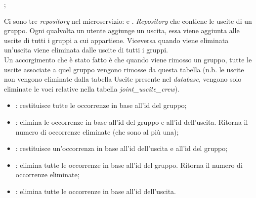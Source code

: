 \begin{center}
    ;
\end{center}
Ci sono tre \textit{repository} nel \gls{microservizio}:  e . 
\label{JointUsciteCrewRepository}
\textit{Repository} che contiene le uscite di un gruppo. Ogni qualvolta un utente aggiunge un uscita, essa viene aggiunta alle uscite di tutti i gruppi a cui appartiene. Viceversa quando viene eliminata un'uscita viene eliminata dalle uscite di tutti i gruppi.\\
Un accorgimento che è stato fatto è che quando viene rimosso un gruppo, tutte le uscite associate a quel gruppo vengono rimosse da questa tabella (n.b. le uscite non vengono eliminate dalla tabella Uscite presente nel \textit{database}, vengono solo eliminate le voci relative nella tabella \textit{joint\_uscite\_crew}).
\begin{itemize}
    \item {}: restituisce tutte le occorrenze in base all'id del gruppo;
    \item {}: elimina le occorrenze in base all'id del gruppo e all'id dell'uscita. Ritorna il numero di occorrenze eliminate (che sono al più una);
    \item {}: restituisce un'occorrenza in base all'id dell'uscita e all'id del gruppo;
    \item {}: elimina tutte le occorrenze in base all'id del gruppo. Ritorna il numero di occorrenze eliminate;
    \item {}: elimina tutte le occorrenze in base all'id dell'uscita.
\end{itemize}






